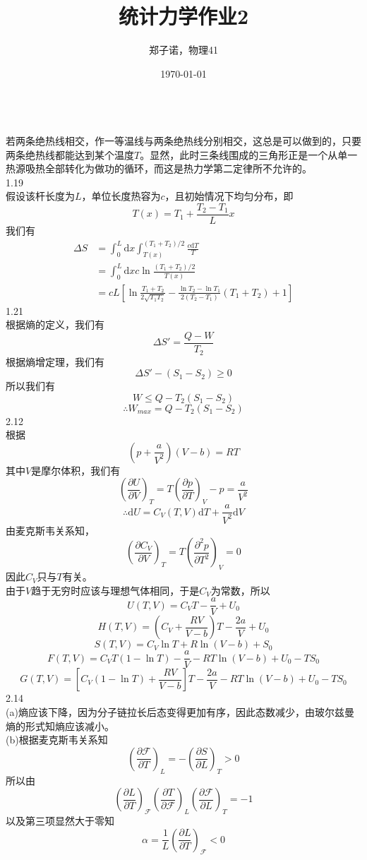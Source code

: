 \documentclass[utf8]{ctexart}
\title{统计力学作业2}
\author{郑子诺，物理41}
\date{\today}
\begin{document}
\maketitle
{}\\
若两条绝热线相交，作一等温线与两条绝热线分别相交，这总是可以做到的，只要两条绝热线都能达到某个温度$T$。显然，此时三条线围成的三角形正是一个从单一热源吸热全部转化为做功的循环，而这是热力学第二定律所不允许的。\\
1.19\\
假设该杆长度为$L$，单位长度热容为$c$，且初始情况下均匀分布，即
\[T(x)=T_1+\frac{T_2-T_1}{L}x\]
我们有
\begin{align*}
	\Delta S&=\int_{0}^{L}\mathrm{d}x\int_{T(x)}^{(T_1+T_2)/2}\frac{c\mathrm{d}T}{T}\\
	&=\int_{0}^{L}\mathrm{d}xc\ln\frac{(T_1+T_2)/2}{T(x)}\\
	&=cL\left[\ln\frac{T_1+T_2}{2\sqrt{T_1T_2}}-\frac{\ln T_2-\ln T_1}{2(T_2-T_1)}(T_1+T_2)+1\right]
\end{align*}
1.21\\
根据熵的定义，我们有
\[\Delta S'=\frac{Q-W}{T_2}\]
根据熵增定理，我们有
\[\Delta S'-(S_1-S_2)\ge0\]
所以我们有
\[W\le Q-T_2(S_1-S_2)\]
\[\therefore W_{max}=Q-T_2(S_1-S_2)\]
2.12\\
根据
\[(p+\frac{a}{V^2})(V-b)=RT\]
其中$V$是摩尔体积，我们有
\[\left(\frac{\partial U}{\partial V}\right)_T=T\left(\frac{\partial p}{\partial T}\right)_V-p=\frac{a}{V^2}\]
\[\therefore \mathrm{d}U=C_V(T,V)\mathrm{d}T+\frac{a}{V^2}\mathrm{d}V\]
由麦克斯韦关系知，
\[\left(\frac{\partial C_V}{\partial V}\right)_T=T\left(\frac{\partial^2p}{\partial T^2}\right)_V=0\]
因此$C_V$只与$T$有关。\\
由于$V$趋于无穷时应该与理想气体相同，于是$C_V$为常数，所以
\[U(T,V)=C_VT-\frac{a}{V}+U_0\]
\[H(T,V)=\left(C_V+\frac{RV}{V-b}\right)T-\frac{2a}{V}+U_0\]
\[S(T,V)=C_V\ln T+R\ln(V-b)+S_0\]
\[F(T,V)=C_VT(1-\ln T)-\frac{a}{V}-RT\ln(V-b)+U_0-TS_0\]
\[G(T,V)=\left[C_V(1-\ln T)+\frac{RV}{V-b}\right]T-\frac{2a}{V}-RT\ln(V-b)+U_0-TS_0\]
2.14\\
(a)熵应该下降，因为分子链拉长后态变得更加有序，因此态数减少，由玻尔兹曼熵的形式知熵应该减小。\\
(b)根据麦克斯韦关系知
\[\left(\frac{\partial\mathcal{F}}{\partial T}\right)_L=-\left(\frac{\partial S}{\partial L}\right)_T>0\]
所以由
\[\left(\frac{\partial L}{\partial T}\right)_\mathcal{F}\left(\frac{\partial T}{\partial\mathcal{F}}\right)_L\left(\frac{\partial\mathcal{F}}{\partial L}\right)_T=-1\]
以及第三项显然大于零知
\[\alpha=\frac{1}{L}\left(\frac{\partial L}{\partial T}\right)_\mathcal{F}<0\]
\end{document}
